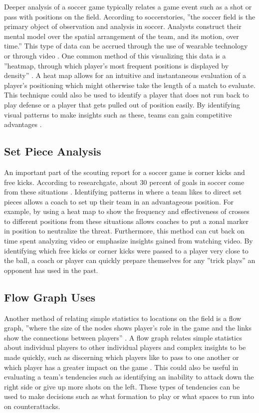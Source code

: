 \documentclass[sigconf]{acmart}
\begin{document}
Deeper analysis of a soccer game typically relates a game event such as a shot or pass with positions on the field. According to soccerstories, ''the soccer field is the primary object of observation and analysis in soccer. Analysts construct their mental model over the spatial arrangement of the team, and its motion, over time.''\cite{SoccerStories} This type of data can be accrued through the use of wearable technology or through video \cite{SoccerStories}. One common method of this visualizing this data is a ''heatmap, through which player's most frequent positions is displayed by density'' \cite{SoccerStories}. A heat map allows for an intuitive and instantaneous evaluation of a player’s positioning which might otherwise take the length of a match to evaluate. This technique could also be used to identify a player that does not run back to play defense or a player that gets pulled out of position easily. By identifying visual patterns to make insights such as these, teams can gain competitive advantages \cite{SoccerStories}.

\subsection{Set Piece Analysis}

An important part of the scouting report for a soccer game is corner kicks and free kicks. According to researchgate, about 30 percent of goals in soccer come from these situations \cite{ResearchGate}. Identifying patterns in where a team likes to direct set pieces allows a coach to set up their team in an advantageous position. For example, by using a heat map to show the frequency and effectiveness of crosses to different positions from these situations allows coaches to put a zonal marker in position to neutralize the threat. Furthermore, this method can cut back on time spent analyzing video or emphasize insights gained from watching video. By identifying which free kicks or corner kicks were passed to a player very close to the ball, a coach or player can quickly prepare themselves for any ''trick plays'' an opponent has used in the past.

\subsection{Flow Graph Uses}

Another method of relating simple statistics to locations on the field is a flow graph, ''where the size of the nodes shows player's role in the game and the links show the connections between players'' \cite{SoccerStories}. A flow graph relates simple statistics about individual players to other individual players and complex insights to be made quickly, such as discerning which players like to pass to one another or which player has a greater impact on the game \cite{SoccerStories}. This could also be useful in evaluating a team’s tendencies such as identifying an inability to attack down the right side or give up more shots on the left. These types of tendencies can be used to make decisions such as what formation to play or what spaces to run into on counterattacks.
\end{document}
